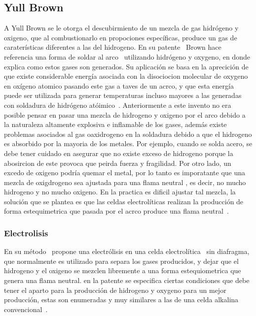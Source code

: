 \documentclass[12pt,twoside,onecolumn]{article}
\begin{document}
\subsection{Yull Brown} 
A Yull Brown se le otorga el descubirmiento de un mezcla de gas hidrógeno y oxigeno, que al combustionarlo en propociones específicas, produce un gas de caraterísticas diferentes a las del hidrogeno. En su patente~\cite{brown1977welding} Brown hace referencia una forma de soldar al arco~\cite{wiki:arco} utilizando hidrógeno y oxygeno, en donde explica como estos gases son generados. Su aplicación se basa en la aprecición de que existe considerable energía asociada con la disociocion molecular de oxygeno en oxígeno atomico pasando este gas a taves de un acrco, y que esta energía puede ser utilizada para generar temperaturas incluso mayores a las generadas con soldadura de hidrógeno atóimico~\cite{wiki:hidro}. Anteriormente a este invento no era posible pensar en pasar una mezcla de hidrogeno y oxigeno por el arco debido a la naturaleza altamente explosiva e inflamable de los gases, además existe problemas asociados al gas oaxidrogeno en la soldadura debido a que el hidrogeno es absorbido por la mayoria de los metales. Por ejemplo, cuando se solda acero, se debe tener cuidado en asegurar que no existe exceso de hidrogeno porque la abosircion de este provoca que peirda fuerza y fragilidad. Por otro lado, un excedo de oxigeno podría quemar el metal, por lo tanto es imporatante que una mezcla de oxigdrogeno sea ajustada para una flama neutral , es decir, no mucho hidrogeno y no mucho oxigeno. En la practica es dificil ajustar tal mezcla, la solución que se plantea es que las celdas electrolíticas realizan la producción de forma estequimetrica que pasada por el acrco produce una flama neutral~\cite{brown1977welding}.

\subsubsection{Electrolisis}
En su m\'etodo~\cite{brown1977welding} propone una electrólisis en una celda electrolítica~\cite{wiki:electrocell} sin diafragma, que normalmente es utilizado para separa los gases producidos, y dejar que el hidrogeno y el oxigeno se mezclen libremente a una forma estequiometrica que genera una flama neutral. en la patente se especifica ciertas condiciones que debe tener el aparto para la producción de hidrogeno y oxygeno para un mejor producción, estas son enumeradas y muy similares a las de una celda alkalina convencional~\cite{zeng2010recent}.
 
\end{document}
